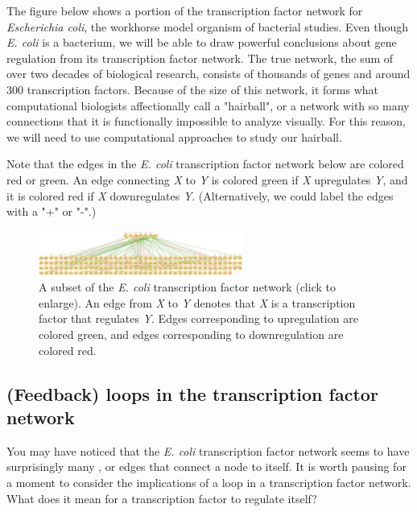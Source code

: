 The figure below shows a portion of the transcription factor network for \textit{Escherichia coli}, the workhorse model organism of bacterial studies. Even though \textit{E. coli} is a bacterium, we will be able to draw powerful conclusions about gene regulation from its transcription factor network. The true network, the sum of over two decades of biological research, consists of thousands of genes and around 300 transcription factors. Because of the size of this network, it forms what computational biologists affectionally call a "hairball", or a network with so many connections that it is functionally impossible to analyze visually. For this reason, we will need to use computational approaches to study our hairball.

Note that the edges in the \textit{E. coli} transcription factor network below are colored red or green. An edge connecting \textit{X} to \textit{Y} is colored green if \textit{X} upregulates \textit{Y}, and it is colored red if \textit{X} downregulates \textit{Y}. (Alternatively, we could label the edges with a "+" or "-".)

\begin{figure}[h]
\centering
\mySfFamily
\includegraphics[width = 0.6\textwidth]{../assets/images/600px/e_coli_tf_network.jpeg}
\caption{A subset of the \textit{E. coli} transcription factor network (click to enlarge). An edge from \textit{X} to \textit{Y} denotes that \textit{X} is a transcription factor that regulates \textit{Y}. Edges corresponding to upregulation are colored green, and edges corresponding to downregulation are colored red.}
\label{fig:e_coli_tf_network}
\end{figure}

\begin{qbox}\end{qbox} 

\FloatBarrier
{}
\subsection{(Feedback) loops in the transcription factor network}

You may have noticed that the \textit{E. coli} transcription factor network seems to have surprisingly many , or edges that connect a node to itself. It is worth pausing for a moment to consider the implications of a loop in a transcription factor network. What does it mean for a transcription factor to regulate itself?

